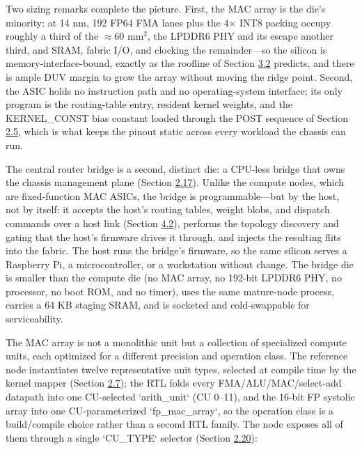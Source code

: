 \documentclass[10pt,twocolumn]{article}
\begin{document}
Two sizing remarks complete the picture. First, the MAC array is the die's minority: at 14 nm, 192 FP64 FMA lanes plus the 4$\times$ INT8 packing occupy roughly a third of the $\approx$60 mm$^2$, the LPDDR6 PHY and its escape another third, and SRAM, fabric I/O, and clocking the remainder---so the silicon is memory-interface-bound, exactly as the roofline of Section \hyperref[sec:3.2]{3.2} predicts, and there is ample DUV margin to grow the array without moving the ridge point. Second, the ASIC holds no instruction path and no operating-system interface; its only program is the routing-table entry, resident kernel weights, and the KERNEL\_CONST bias constant loaded through the POST sequence of Section \hyperref[sec:2.5]{2.5}, which is what keeps the pinout static across every workload the chassis can run.

The central router bridge is a second, distinct die: a CPU-less bridge that owns the chassis management plane (Section \hyperref[sec:2.17]{2.17}). Unlike the compute nodes, which are fixed-function MAC ASICs, the bridge is programmable---but by the host, not by itself: it accepts the host's routing tables, weight blobs, and dispatch commands over a host link (Section \hyperref[sec:4.2]{4.2}), performs the topology discovery and gating that the host's firmware drives it through, and injects the resulting flits into the fabric. The host runs the bridge's firmware, so the same silicon serves a Raspberry Pi, a microcontroller, or a workstation without change. The bridge die is smaller than the compute die (no MAC array, no 192-bit LPDDR6 PHY, no processor, no boot ROM, and no timer), uses the same mature-node process, carries a 64 KB staging SRAM, and is socketed and cold-swappable for serviceability.

The MAC array is not a monolithic unit but a collection of specialized compute units, each optimized for a different precision and operation class. The reference node instantiates twelve representative unit types, selected at compile time by the kernel mapper (Section \hyperref[sec:2.7]{2.7}); the RTL folds every FMA/ALU/MAC/select-add datapath into one CU-selected `arith\_unit` (CU 0--11), and the 16-bit FP systolic array into one CU-parameterized `fp\_mac\_array`, so the operation class is a build/compile choice rather than a second RTL family. The node exposes all of them through a single `CU\_TYPE` selector (Section \hyperref[sec:2.20]{2.20}):
\end{document}
